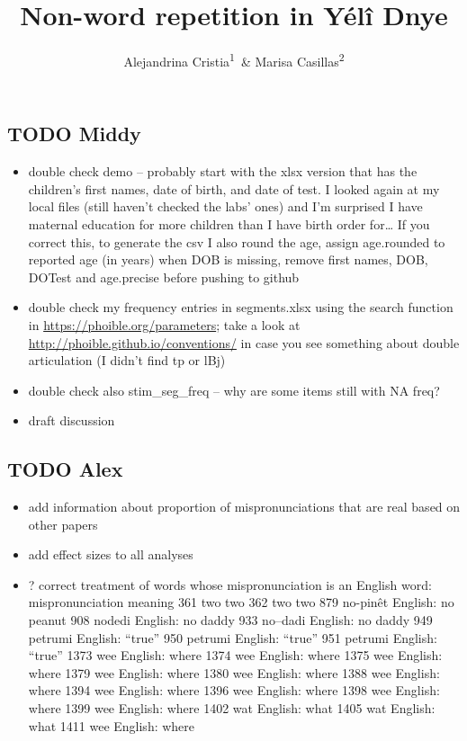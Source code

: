 \documentclass[english,,man,floatsintext]{apa6}
\title{Non-word repetition in Yélî Dnye}
\author{Alejandrina Cristia\textsuperscript{1}~\& Marisa
Casillas\textsuperscript{2}}
\date{}
\providecommand{\tightlist}{%
  \setlength{\itemsep}{0pt}\setlength{\parskip}{0pt}}
\begin{document}
\maketitle

\subsection{TODO Middy}\label{todo-middy}

\begin{itemize}
\tightlist
\item
  double check demo -- probably start with the xlsx version that has the
  children's first names, date of birth, and date of test. I looked
  again at my local files (still haven't checked the labs' ones) and I'm
  surprised I have maternal education for more children than I have
  birth order for\ldots{} If you correct this, to generate the csv I
  also round the age, assign age.rounded to reported age (in years) when
  DOB is missing, remove first names, DOB, DOTest and age.precise before
  pushing to github
\item
  double check my frequency entries in segments.xlsx using the search
  function in \url{https://phoible.org/parameters}; take a look at
  \url{http://phoible.github.io/conventions/} in case you see something
  about double articulation (I didn't find tp or lBj)
\item
  double check also stim\_seg\_freq -- why are some items still with NA
  freq?
\item
  draft discussion
\end{itemize}

\subsection{TODO Alex}\label{todo-alex}

\begin{itemize}
\tightlist
\item
  add information about proportion of mispronunciations that are real
  based on other papers
\item
  add effect sizes to all analyses
\item
  ? correct treatment of words whose mispronunciation is an English
  word: mispronunciation meaning 361 two two 362 two two 879 no-pinêt
  English: no peanut 908 nodedi English: no daddy 933 no--dadi English:
  no daddy 949 petrumi English: ``true'' 950 petrumi English: ``true''
  951 petrumi English: ``true'' 1373 wee English: where 1374 wee
  English: where 1375 wee English: where 1379 wee English: where 1380
  wee English: where 1388 wee English: where 1394 wee English: where
  1396 wee English: where 1398 wee English: where 1399 wee English:
  where 1402 wat English: what 1405 wat English: what 1411 wee English:
  where
\end{itemize}
\end{document}
